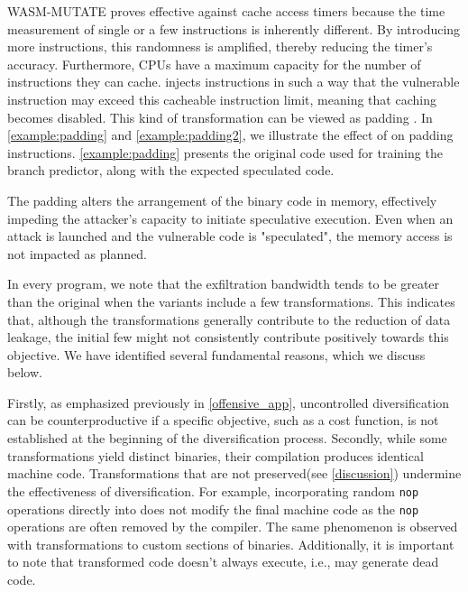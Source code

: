 

WASM-MUTATE proves effective against cache access timers because the time measurement of single or a few instructions is inherently different. 
By introducing more instructions, this randomness is amplified, thereby reducing the timer's accuracy.
Furthermore, CPUs have a maximum capacity for the number of instructions they can cache.
\tool injects instructions in such a way that the vulnerable instruction may exceed this cacheable instruction limit, meaning that caching becomes disabled.
This kind of transformation can be viewed as padding \cite{padding}.
In \autoref{example:padding} and \autoref{example:padding2}, we illustrate the effect of \tool on padding instructions.
\autoref{example:padding} presents the original code used for training the branch predictor, along with the expected speculated code.



The padding alters the arrangement of the binary code in memory, effectively impeding the attacker's capacity to initiate speculative execution.
Even when an attack is launched and the vulnerable code is "speculated", the memory access is not impacted as planned.


In every program, we note that the exfiltration bandwidth tends to be greater than the original when the variants include a few transformations.
This indicates that, although the transformations generally contribute to the reduction of data leakage, the initial few might not consistently contribute positively towards this objective.
We have identified several fundamental reasons, which we discuss below.

Firstly, as emphasized previously in \autoref{offensive_app}, uncontrolled diversification can be counterproductive if a specific objective, such as a cost function, is not established at the beginning of the diversification process.
Secondly, while some transformations yield distinct \wasm binaries, their compilation produces identical machine code.
Transformations that are not preserved(see \autoref{discussion}) undermine the effectiveness of diversification.
For example, incorporating random \texttt{nop} operations directly into \wasm does not modify the final machine code as the \texttt{nop} operations are often removed by the compiler.
The same phenomenon is observed with transformations to custom sections of \Wasm binaries.
Additionally, it is important to note that transformed code doesn't always execute, i.e., \tool may generate dead code.





